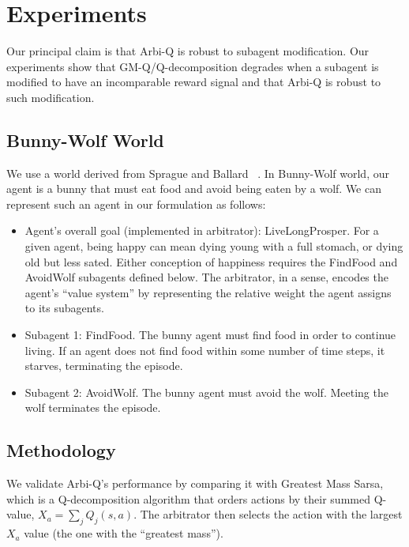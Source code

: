 \section{Experiments}

Our principal claim is that Arbi-Q is robust to subagent modification.  Our experiments show that GM-Q/Q-decomposition degrades when a subagent is modified to have an incomparable reward signal and that Arbi-Q is robust to such modification.

\subsection{Bunny-Wolf World}

We use a world derived from Sprague and Ballard ~\cite{sprague2003multiple-goal}.  In Bunny-Wolf world, our agent is a bunny that must eat food and avoid being eaten by a wolf.  We can represent such an agent in our formulation as follows:

\begin{itemize}

\item Agent's overall goal (implemented in arbitrator):
  LiveLongProsper.  For a given agent, being happy can mean dying
  young with a full stomach, or dying old but less sated.  Either
  conception of happiness requires the FindFood and AvoidWolf
  subagents defined below.  The arbitrator, in a sense, encodes the
  agent's ``value system'' by representing the relative weight the
  agent assigns to its subagents.

\item Subagent 1: FindFood.  The bunny agent must find food in order
  to continue living.  If an agent does not find food within some
  number of time steps, it starves, terminating the episode.

\item Subagent 2: AvoidWolf.  The bunny agent must avoid the wolf.
  Meeting the wolf terminates the episode.

\end{itemize}

\subsection{Methodology}


We validate Arbi-Q's performance by comparing it with Greatest Mass Sarsa, which is a Q-decomposition algorithm that orders actions by their summed Q-value, $X_a=\sum_j Q_j(s,a)$. The arbitrator then selects the action with the largest $X_a$ value (the one with the
  ``greatest mass'').

